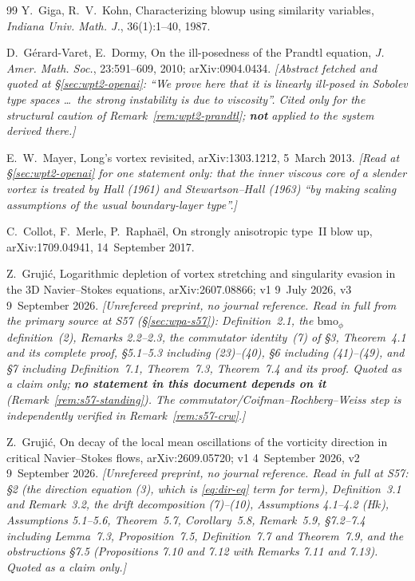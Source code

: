 \documentclass[11pt]{article}
\theoremstyle{definition}
\theoremstyle{remark}
\begin{document}
\begin{thebibliography}{99}
  Y.~Giga, R.~V.~Kohn,
  Characterizing blowup using similarity variables,
  \emph{Indiana Univ. Math. J.}, 36(1):1--40, 1987.

  D.~G\'erard-Varet, E.~Dormy,
  On the ill-posedness of the Prandtl equation,
  \emph{J. Amer. Math. Soc.}, 23:591--609, 2010; arXiv:0904.0434.
  \emph{[Abstract fetched and quoted at \S\ref{sec:wpt2-openai}:
  ``We prove here that it is linearly ill-posed in Sobolev type spaces \dots\
  the strong instability is due to viscosity''. Cited only for the structural
  caution of Remark~\ref{rem:wpt2-prandtl}; \textbf{not} applied to the
  system derived there.]}

  E.~W.~Mayer,
  Long's vortex revisited,
  arXiv:1303.1212, 5~March 2013.
  \emph{[Read at \S\ref{sec:wpt2-openai} for one statement only: that the
  inner viscous core of a slender vortex is treated by Hall (1961) and
  Stewartson--Hall (1963) ``by making scaling assumptions of the usual
  boundary-layer type''.]}

  C.~Collot, F.~Merle, P.~Rapha\"el,
  On strongly anisotropic type~II blow up,
  arXiv:1709.04941, 14~September 2017.

  Z.~Gruji\'c,
  Logarithmic depletion of vortex stretching and singularity evasion in the
  3D Navier--Stokes equations,
  arXiv:2607.08866; v1 9~July 2026, v3 9~September 2026.
  \emph{[Unrefereed preprint, no journal reference. Read in full from the
  primary source at S57 (\S\ref{sec:wpa-s57}): Definition~2.1, the
  $\mathrm{bmo}_\phi$ definition~(2), Remarks 2.2--2.3, the commutator
  identity~(7) of \S3, Theorem~4.1 and its complete proof, \S5.1--5.3
  including (23)--(40), \S6 including (41)--(49), and \S7 including
  Definition~7.1, Theorem~7.3, Theorem~7.4 and its proof. Quoted as a claim
  only; \textbf{no statement in this document depends on it}
  (Remark~\ref{rem:s57-standing}). The commutator/Coifman--Rochberg--Weiss
  step is independently verified in Remark~\ref{rem:s57-crw}.]}

  Z.~Gruji\'c,
  On decay of the local mean oscillations of the vorticity direction in
  critical Navier--Stokes flows,
  arXiv:2609.05720; v1 4~September 2026, v2 9~September 2026.
  \emph{[Unrefereed preprint, no journal reference. Read in full at S57: \S2
  (the direction equation (3), which is \eqref{eq:dir-eq} term for term),
  Definition~3.1 and Remark~3.2, the drift decomposition (7)--(10),
  Assumptions 4.1--4.2 (H$k$), Assumptions 5.1--5.6, Theorem~5.7,
  Corollary~5.8, Remark~5.9, \S7.2--7.4 including Lemma~7.3,
  Proposition~7.5, Definition~7.7 and Theorem~7.9, and the obstructions
  \S7.5 (Propositions 7.10 and 7.12 with Remarks 7.11 and 7.13). Quoted as a
  claim only.]}


\end{thebibliography}
\end{document}
